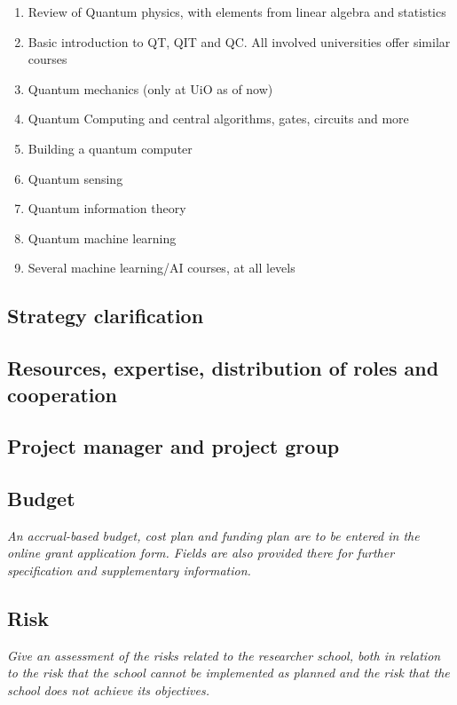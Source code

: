 \documentclass{scrreprt}
\begin{document}
\begin{\itemize}
\begin{enumerate}
\item Review of Quantum physics, with elements from linear algebra and statistics
\item Basic introduction to QT, QIT and QC. All involved universities offer similar courses
\item Quantum mechanics (only at UiO as of now)
\item Quantum Computing and central algorithms, gates, circuits and more
\item Building a quantum computer
\item Quantum sensing
\item Quantum information theory
\item Quantum machine learning
\item Several  machine learning/AI courses, at all levels
\end{enumerate}






\subsection{Strategy clarification}

\subsection{Resources, expertise, distribution of roles and cooperation}

\subsection{Project manager and project group}



\subsection{Budget}

{\em An accrual-based budget, cost plan and funding plan are to be entered
in the online grant application form. Fields are also provided there
for further specification and supplementary information.}

\subsection{Risk}

{\em Give an assessment of the risks related to the researcher school, both
in relation to the risk that the school cannot be implemented as
planned and the risk that the school does not achieve its objectives.}




\end{\itemize}
\end{document}
